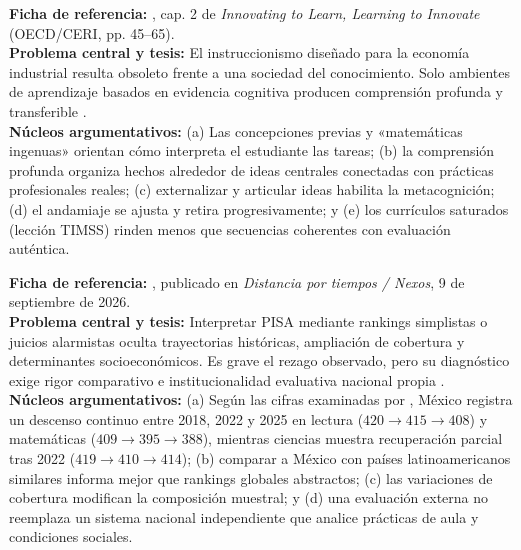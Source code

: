 \documentclass[spanish,letterpaper,oneside]{article}
\begin{document}
\begin{tcolorbox}[colback=iiiepeMint,colframe=iiiepeAqua!80!black,title=\textbf{Reporte de lectura 2 · R. Keith Sawyer (2008): Mejorando el aprendizaje (Ciencias del Aprendizaje)},breakable]
\textbf{Ficha de referencia:} \citet{sawyer2008optimizing}, cap. 2 de \textit{Innovating to Learn, Learning to Innovate} (OECD/CERI, pp. 45--65).\\
\textbf{Problema central y tesis:} El instruccionismo diseñado para la economía industrial resulta obsoleto frente a una sociedad del conocimiento. Solo ambientes de aprendizaje basados en evidencia cognitiva producen comprensión profunda y transferible \citep{sawyer2008optimizing}.\\[4pt]
\textbf{Núcleos argumentativos:} (a) Las concepciones previas y «matemáticas ingenuas» orientan cómo interpreta el estudiante las tareas; (b) la comprensión profunda organiza hechos alrededor de ideas centrales conectadas con prácticas profesionales reales; (c) externalizar y articular ideas habilita la metacognición; (d) el andamiaje se ajusta y retira progresivamente; y (e) los currículos saturados (lección TIMSS) rinden menos que secuencias coherentes con evaluación auténtica.
\end{tcolorbox}

\begin{tcolorbox}[colback=iiiepeWarm,colframe=iiiepeOrange!90!black,title=\textbf{Reporte de lectura 3 · Felipe Martínez Rizo (2026): Lectura contextualizada de PISA 2025},breakable]
\textbf{Ficha de referencia:} \citet{martinezRizo2026pisa}, publicado en \textit{Distancia por tiempos / Nexos}, 9 de septiembre de 2026.\\
\textbf{Problema central y tesis:} Interpretar PISA mediante rankings simplistas o juicios alarmistas oculta trayectorias históricas, ampliación de cobertura y determinantes socioeconómicos. Es grave el rezago observado, pero su diagnóstico exige rigor comparativo e institucionalidad evaluativa nacional propia \citep{martinezRizo2026pisa}.\\[4pt]
\textbf{Núcleos argumentativos:} (a) Según las cifras examinadas por \citet{martinezRizo2026pisa}, México registra un descenso continuo entre 2018, 2022 y 2025 en lectura ($420 \rightarrow 415 \rightarrow 408$) y matemáticas ($409 \rightarrow 395 \rightarrow 388$), mientras ciencias muestra recuperación parcial tras 2022 ($419 \rightarrow 410 \rightarrow 414$); (b) comparar a México con países latinoamericanos similares informa mejor que rankings globales abstractos; (c) las variaciones de cobertura modifican la composición muestral; y (d) una evaluación externa no reemplaza un sistema nacional independiente que analice prácticas de aula y condiciones sociales.
\end{tcolorbox}
\end{document}

